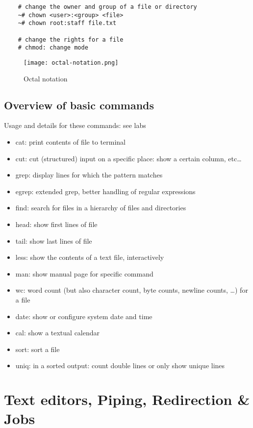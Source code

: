 \documentclass{article}
\begin{document}
\begin{verbatim}
    # change the owner and group of a file or directory
    ~# chown <user>:<group> <file>
    ~# chown root:staff file.txt
    
    # change the rights for a file
    # chmod: change mode
\end{verbatim}

\begin{figure}[H]
    \centering
    \texttt{[image: octal-notation.png]}
    \caption{Octal notation}
\end{figure}


\subsection{Overview of basic commands}

Usage and details for these commands: see labs

\begin{itemize}
    \item cat: print contents of file to terminal
    \item cut: cut (structured) input on a specific place: show a certain column, etc\dots
    \item grep: display lines for which the pattern matches
    \item egrep: extended grep, better handling of regular expressions
    \item find: search for files in a hierarchy of files and directories
    \item head: show first lines of file
    \item tail: show last lines of file
    \item less: show the contents of a text file, interactively
    \item man: show manual page for specific command
    \item wc: word count (but also character count, byte counts, newline counts, \dots) for a file
    \item date: show or configure system date and time
    \item cal: show a textual calendar
    \item sort: sort a file
    \item uniq: in a sorted output: count double lines or only show unique lines
\end{itemize}

\section{Text editors, Piping, Redirection \& Jobs}
\end{document}
